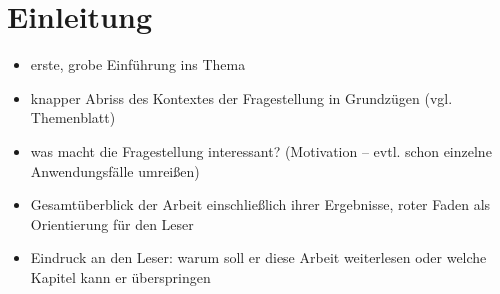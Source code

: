 \chapter{Einleitung}

\begin{itemize}
	\item erste, grobe Einführung ins Thema
	\item knapper Abriss des Kontextes der Fragestellung in Grundzügen (vgl. Themenblatt)
	\item was macht die Fragestellung interessant? (Motivation -- evtl. schon einzelne Anwendungsfälle umreißen)
	\item Gesamtüberblick der Arbeit einschließlich ihrer Ergebnisse, roter Faden als Orientierung für den Leser
	\item Eindruck an den Leser: warum soll er diese Arbeit weiterlesen oder welche Kapitel kann er überspringen
\end{itemize}

